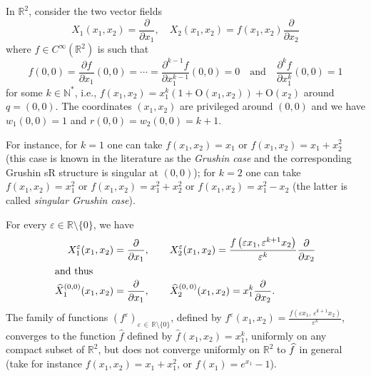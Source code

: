 \documentclass[AHL,Unicode,published]{cedram}
\newcommand*\R{\mathbb{R}}
\newcommand*\N{\mathbb{N}}
\newcommand{\rmO}{\mathrm{O}}
\let\oldhat\hat
\renewcommand*{\hat}[1]{\mathchoice{\widehat{#1}}{\widehat{#1}}{\oldhat{#1}}{\oldhat{#1}}}
\begin{document}
\begin{exem}\label{example_lemmaYi}
In $\R^2$, consider the two vector fields
\[
X_1(x_1,x_2) = \frac{\partial}{\partial x_1},\quad X_2(x_1,x_2) = f(x_1,x_2)\frac{\partial}{\partial x_2}
\]
where $f\in C^\infty(\R^2)$ is such that
\[
f(0,0)=\frac{\partial f}{\partial x_1}(0,0)=\cdots=\frac{\partial^{k-1}f}{\partial x_1^{k-1}}(0,0)=0\quad\text{and}\quad\frac{\partial^k f}{\partial x_1^k}(0,0)=1
\]
for some $k\in\N^*$, i.e., $f(x_1,x_2)=x_1^k(1+\rmO(x_1,x_2))+\rmO(x_2)$ around $q=(0,0)$. The coordinates $(x_1,x_2)$ are privileged around $(0,0)$ and we have $w_1(0,0)=1$ and $r(0,0)=w_2(0,0)=k+1$.

For instance, for $k=1$ one can take $f(x_1,x_2)=x_1$ or $f(x_1,x_2)=x_1+x_2^2$ (this case is known in the literature as the \emph{Grushin case} and the corresponding Grushin sR structure is singular at $(0,0)$); for $k=2$ one can take $f(x_1,x_2)=x_1^2$ or $f(x_1,x_2)=x_1^2+x_2^2$ or $f(x_1,x_2)=x_1^2-x_2$ (the latter is called \emph{singular Grushin case}).

For every $\varepsilon\in\R\setminus\{0\}$, we have
\begin{align*}
X_1^\varepsilon(x_1,x_2) &= \frac{\partial}{\partial x_1},\qquad X_2^\varepsilon(x_1,x_2) = \frac{f\left(\varepsilon x_1,\varepsilon^{k+1} x_2\right)}{\varepsilon^k}\frac{\partial}{\partial x_2}
\\
\intertext{and thus}
\widehat{X}^{(0,0)}_1(x_1,x_2) &= \frac{\partial}{\partial x_1},\qquad \widehat{X}^{(0,\,0)}_2(x_1,x_2) = x_1^k\frac{\partial}{\partial x_2}.
\end{align*}
The family of functions $(f^\varepsilon)_{\varepsilon\,\in\,\R\setminus\{0\}}$, defined by $f^\varepsilon(x_1,x_2)=\tfrac{f(\varepsilon x_1,\,\varepsilon^{k+1} x_2)}{\varepsilon^k}$, converges to the function $\widehat f$ defined by $\widehat f(x_1,x_2)=x_1^k$, uniformly on any compact subset of $\R^2$, but does not converge uniformly on $\R^2$ to $\hat f$ in general (take for instance $f(x_1,x_2)=x_1+x_1^2$, or $f(x_1)=e^{x_1}-1$).


\end{exem}
\end{document}
